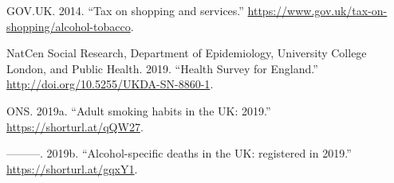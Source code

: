 \documentclass[
  11pt,
]{article}
\newlength{\cslhangindent}
\newenvironment{CSLReferences}[2] %
 {\begin{list}{}{%
  \setlength{\itemindent}{0pt}
  \setlength{\leftmargin}{0pt}
  \setlength{\parsep}{0pt}
  \ifodd #1
   \setlength{\leftmargin}{\cslhangindent}
   \setlength{\itemindent}{-1\cslhangindent}
  \fi
  \setlength{\itemsep}{#2\baselineskip}}}
 {\end{list}}
\begin{document}
\label{refs}
\begin{CSLReferences}{1}{0}
GOV.UK. 2014. {``{Tax on shopping and services}.''}
\url{https://www.gov.uk/tax-on-shopping/alcohol-tobacco}.

NatCen Social Research, Department of Epidemiology, University College
London, and Public Health. 2019. {``{Health Survey for England}.''}
\url{http://doi.org/10.5255/UKDA-SN-8860-1}.

ONS. 2019a. {``{Adult smoking habits in the UK: 2019}.''}
\url{https://shorturl.at/qQW27}.

---------. 2019b. {``{Alcohol-specific deaths in the UK: registered in
2019}.''} \url{https://shorturl.at/gqxY1}.

\end{CSLReferences}
\end{document}
